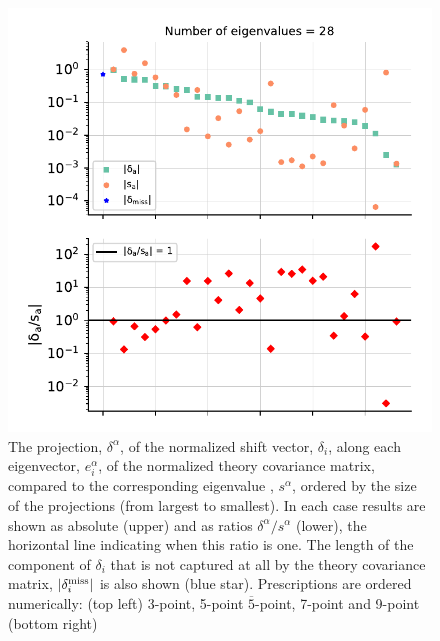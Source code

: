 \begin{figure}[H]
\begin{center}
    \includegraphics[scale=0.55]{mhous/plots/projector_eigenvalue_ratio_9pt_global.pdf}
    \caption{\small The projection, $\delta^\alpha$, of the normalized shift vector,
      $\delta_i$, along each eigenvector, $e^\alpha_i$, of the normalized theory covariance
      matrix, compared to the corresponding eigenvalue ,
    $s^\alpha$, ordered
      by the size of the projections (from largest to
      smallest). In each case results are shown as absolute (upper) and
      as ratios $\delta^\alpha/s^\alpha$ (lower), the horizontal line indicating when this ratio is one.  The length of the 
        component of 
       $\delta_i$ that is not captured at all by the theory covariance 
    matrix, $|\delta^{\rm miss}_i|$ is also shown (blue star).
      Prescriptions are ordered numerically: (top left) 3-point, 5-point
      $\overline{5}$-point, 7-point and 9-point (bottom right)}
        \label{fig:evals_all_prescriptions}
  \end{center}
\end{figure}
